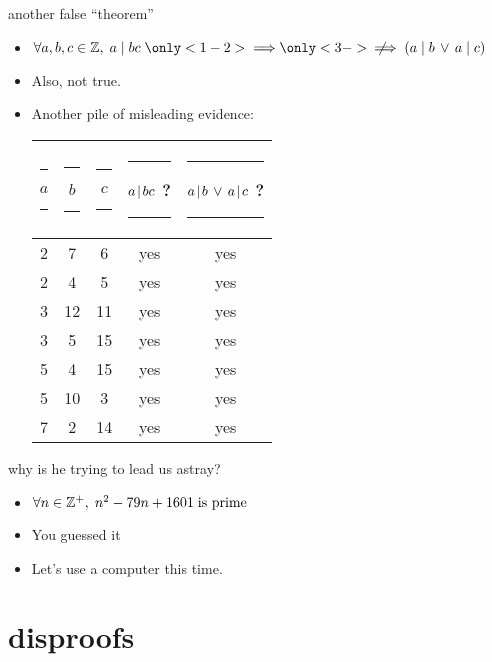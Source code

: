\documentclass[landscape]{beamer}
\newcommand{\notimplies}{\;\not\!\!\!\implies}
\begin{document}
\begin{frame}{another false ``theorem''}
\begin{itemize}
\item $\forall a,b,c \in \Integers, \; a \mid bc \; \only<1-2>{\implies} \only<3->{\,\notimplies} \; ( a \mid b \, \lor \, a \mid c )$ \pause
\item Also, not true.\pause \pause
\item Another pile of misleading evidence: \pause

\begin{center}
\begin{tabular}{ccc|c|c}
\rule[-4pt]{0pt}{20pt}\rule{6pt}{0pt}$a$\rule{6pt}{0pt} & \rule{6pt}{0pt}$b$\rule{6pt}{0pt} & \rule{6pt}{0pt}$c$\rule{6pt}{0pt} & \rule{6pt}{0pt}$a \!\mid\! bc$ ?\rule{6pt}{0pt} & \rule{6pt}{0pt}$ a \!\mid\! b \, \lor \, a \!\mid\! c $ ? \rule{6pt}{0pt}\\ \hline
\rule[-4pt]{0pt}{20pt}2 & 7 & 6 & yes & yes \\  
\rule[-4pt]{0pt}{20pt}2 & 4 & 5 & yes & yes \\  
\rule[-4pt]{0pt}{20pt}3 & 12 & 11 & yes & yes \\
\rule[-4pt]{0pt}{20pt}3 & 5 & 15 & yes & yes \\
\rule[-4pt]{0pt}{20pt}5 & 4 & 15 & yes & yes \\
\rule[-4pt]{0pt}{20pt}5 & 10 & 3 & yes & yes \\
\rule[-4pt]{0pt}{20pt}7 & 2 & 14 & yes & yes \\
\end{tabular}
\end{center}
\end{itemize}
\end{frame}

\begin{frame}{why is he trying to lead us astray?}
\begin{itemize}
\item $\forall n \in {\mathbb Z}^+, \; n^2 - 79n + 1601 \; \mbox{is prime} $ \pause
\item You guessed it\textellipsis \pause
\item Let's use a computer this time.
\end{itemize}
\end{frame}

\section{disproofs}
\end{document}
